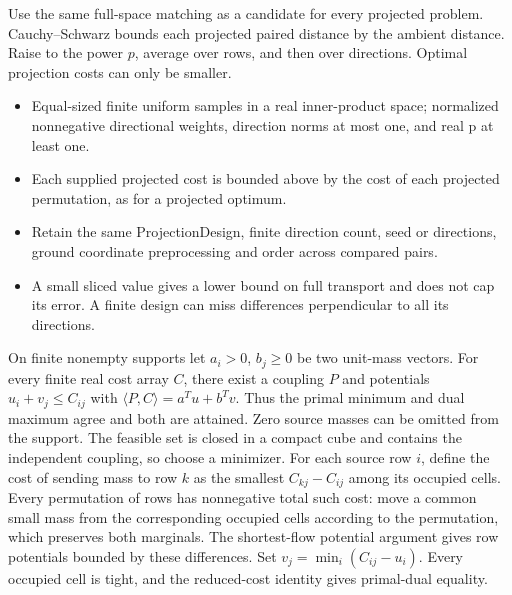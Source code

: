 \expandafter\def\csname statadic@proof@STATADIC-TRANSPORT-004\endcsname{Use the same full-space matching as a candidate for every
  projected problem. Cauchy--Schwarz bounds each projected paired distance by
  the ambient distance. Raise to the power $p$, average over rows, and then
  over directions. Optimal projection costs can only be smaller.}
\expandafter\def\csname statadic@assumptions@STATADIC-TRANSPORT-004\endcsname{\begin{itemize}
\item Equal-sized finite uniform samples in a real inner-product space; normalized nonnegative directional weights, direction norms at most one, and real p at least one.
\item Each supplied projected cost is bounded above by the cost of each projected permutation, as for a projected optimum.
\end{itemize}}
\expandafter\def\csname statadic@diagnostics@STATADIC-TRANSPORT-004\endcsname{\begin{itemize}
\item Retain the same ProjectionDesign, finite direction count, seed or directions, ground coordinate preprocessing and order across compared pairs.
\item A small sliced value gives a lower bound on full transport and does not cap its error. A finite design can miss differences perpendicular to all its directions.
\end{itemize}}
\expandafter\def\csname statadic@statement@STATADIC-TRANSPORT-005\endcsname{On finite nonempty supports let $a_i>0$, $b_j\ge0$ be
  two unit-mass vectors. For every finite real cost array $C$, there exist
  a coupling $P$ and potentials $u_i+v_j\le C_{ij}$ with
  $\langle P,C\rangle=a^Tu+b^Tv$. Thus the primal minimum and dual maximum
  agree and both are attained. Zero source masses can be omitted from the support.}
\expandafter\def\csname statadic@proof@STATADIC-TRANSPORT-005\endcsname{The feasible set is closed in a compact cube and contains the
  independent coupling, so choose a minimizer. For each source row $i$, define
  the cost of sending mass to row $k$ as the smallest $C_{kj}-C_{ij}$ among
  its occupied cells. Every permutation of rows has nonnegative total such cost:
  move a common small mass from the corresponding occupied cells according
  to the permutation, which preserves both marginals. The shortest-flow
  potential argument gives row potentials bounded by these differences.
  Set $v_j=\min_i(C_{ij}-u_i)$. Every occupied cell is tight, and the
  reduced-cost identity gives primal-dual equality.}
